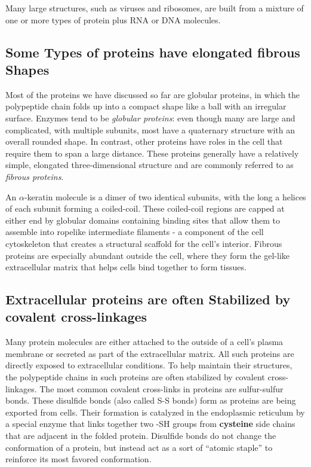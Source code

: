 Many large structures, such as viruses and ribosomes, are built from a
mixture of one or more types of protein plus RNA or DNA molecules.

\subsection{Some Types of proteins have elongated fibrous Shapes}

Most of the proteins we have discussed so far are globular proteins, in
which the polypeptide chain folds up into a compact shape like a ball
with an irregular surface. Enzymes tend to be \textit{globular proteins}: even
though many are large and complicated, with multiple subunits, most
have a quaternary structure with an overall rounded shape.
In contrast, other proteins have roles in the cell that require them to
span a large distance. These proteins generally have a relatively simple,
elongated three-dimensional structure and are commonly referred to as
\textit{fibrous proteins}.

An $\alpha$-keratin molecule is a dimer of two identical subunits, with the
long a helices of each subunit forming a coiled-coil.
These coiled-coil regions are capped at either end by globular domains
containing binding sites that allow them to assemble into ropelike intermediate
filaments - a component of the cell cytoskeleton that creates a
structural scaffold for the cell’s interior.
Fibrous proteins are especially abundant outside the cell, where they
form the gel-like extracellular matrix that helps cells bind together to form
tissues.

\subsection{Extracellular proteins are often Stabilized by covalent cross-linkages}

Many protein molecules are either attached to the outside of a cell’s
plasma membrane or secreted as part of the extracellular matrix. All such
proteins are directly exposed to extracellular conditions. To help maintain
their structures, the polypeptide chains in such proteins are often
stabilized by covalent cross-linkages.
The most common covalent cross-links
in proteins are sulfur-sulfur bonds. These disulfide bonds (also called
S-S bonds) form as proteins are being exported from cells.
Their formation is catalyzed in the endoplasmic reticulum by a special enzyme that
links together two -SH groups from \textbf{cysteine} side chains that are adjacent
in the folded protein.
Disulfide bonds do not change the
conformation of a protein, but instead act as a sort of “atomic staple”
to reinforce its most favored conformation.

